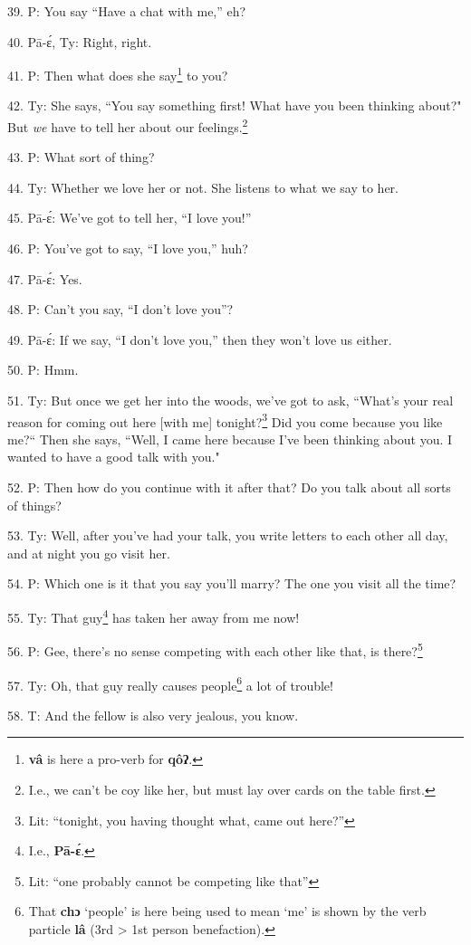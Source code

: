 39. P: You say ``Have a chat with me,'' eh?

40. Pā-ɛ́, Ty: Right, right.

41. P: Then what does she say\footnote{\textbf{vâ} is here a pro-verb for \textbf{qôʔ}.} to you?

42. Ty: She says, ``You say something first! What have you been thinking
about?" But \textit{we} have to tell her about our feelings.\footnote{I.e., we can't be coy like her, but must lay over cards on the table first.}

43. P: What sort of thing?

44. Ty: Whether we love her or not. She listens to what we say to her.

45. Pā-ɛ́: We've got to tell her, ``I love you!''

46. P: You've got to say, ``I love you,'' huh?

47. Pā-ɛ́: Yes.

48. P: Can't you say, ``I don't love you''?

49. Pā-ɛ́: If we say, ``I don't love you,'' then they won't
love us either.

50. P: Hmm.

51. Ty: But once we get her into the woods, we've got to ask, ``What's
your real reason for coming out here [with me] tonight?\footnote{Lit: ``tonight, you having thought what, came out here?''} Did you come because
you like me?`` Then she says, ``Well, I came here because I've
been thinking about you. I wanted to have a good talk with you."

52. P: Then how do you continue with it after that? Do you talk about all
sorts of things?

53. Ty: Well, after you've had your talk, you write letters to each other
all day, and at night you go visit her.

54. P: Which one is it that you say you'll marry? The one you visit all
the time?

55. Ty: That guy\footnote{I.e., \textbf{Pā-ɛ́}.} has taken her away from me now!

56. P: Gee, there's no sense competing with each other like that, is there?\footnote{Lit: ``one probably cannot be competing like that''}

57. Ty: Oh, that guy really causes people\footnote{That \textbf{chɔ} `people' is here being used to mean `me' is shown by the verb particle \textbf{lâ} (3rd > 1st person benefaction).} a lot of trouble!

58. T: And the fellow is also very jealous, you know.

